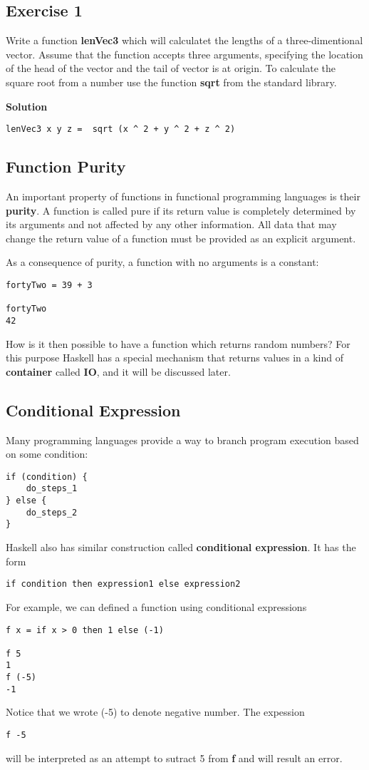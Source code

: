 \documentclass[11pt]{article}
\begin{document}
\subsection{Exercise 1}
\label{sec:org3d34337}
Write a function \textbf{lenVec3} which will calculatet the lengths of a
three-dimentional vector. Assume that the function accepts three
arguments, specifying the location of the head of the vector and the
tail of vector is at origin. To calculate the square root from a
number use the function \textbf{sqrt} from the standard library.

\textbf{Solution}
\begin{verbatim}
lenVec3 x y z =  sqrt (x ^ 2 + y ^ 2 + z ^ 2)
\end{verbatim}

\subsection{Function Purity}
\label{sec:org5565f9c}
An important property of functions in functional programming
languages is their \textbf{purity}. A function is called pure if its
return value is completely determined by its arguments and not
affected by any other information. All data that may change the
return value of a function must be provided as an explicit
argument.

As a consequence of purity, a function with no arguments is a
constant:
\begin{verbatim}
fortyTwo = 39 + 3

fortyTwo
42
\end{verbatim}
How is it then possible to have a function which returns
random numbers? For this purpose Haskell has a special
mechanism that returns values in a kind of \textbf{container} called
\textbf{IO}, and it will be discussed later.

\subsection{Conditional Expression}
\label{sec:orgcc7a5cd}
Many programming languages provide a way to branch program execution based
on some condition:
\begin{verbatim}
if (condition) {
    do_steps_1
} else {
    do_steps_2
}
\end{verbatim}
Haskell also has similar construction called \textbf{conditional
expression}. It has the form
\begin{verbatim}
if condition then expression1 else expression2
\end{verbatim}
For example, we can defined a function using conditional expressions
\begin{verbatim}
f x = if x > 0 then 1 else (-1)

f 5
1
f (-5)
-1
\end{verbatim}
Notice that we wrote (-5) to denote negative number. The expession
\begin{verbatim}
f -5
\end{verbatim}
will be interpreted as an attempt to sutract 5 from \textbf{f} and will
result an error.
\end{document}
